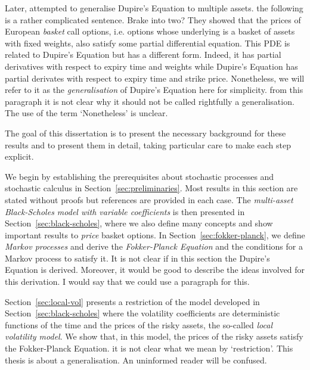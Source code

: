 \documentclass[english]{article}
\newcommand{\comment}[1]{\color{blue}#1\color{black}}
\numberwithin{equation}{section}
\numberwithin{figure}{section}
\theoremstyle{bolddescit}
\theoremstyle{definition}
\theoremstyle{definition}
\theoremstyle{plain}
\theoremstyle{plain}
\theoremstyle{bolddesc}
\theoremstyle{plain}
\theoremstyle{remark}
\begin{document}
Later, \textcite{pablo_amster_towards_2009} attempted to generalise Dupire's Equation to multiple assets.
\comment{the following is a rather complicated sentence. Brake into two?}
They showed that the prices of European \textit{basket} call options, i.e. options whose underlying is a basket of assets with fixed weights, also satisfy some partial differential equation. This PDE is related to Dupire's Equation but has a different form. Indeed, it has partial derivatives with respect to expiry time and weights while Dupire's Equation has partial derivates with respect to expiry time and strike price. Nonetheless, we will refer to it as the \textit{generalisation} of Dupire's Equation here for simplicity. %
\comment{from this paragraph it is not clear why it should not be called rightfully a generalisation. The use of the term `Nonetheless' is unclear.}

The goal of this dissertation is to present the necessary background for these results and to present them in detail, taking particular care to make each step explicit.

We begin by establishing the prerequisites about stochastic processes and stochastic calculus in Section~\ref{sec:preliminaries}. Most results in this section are stated without proofs but references are provided in each case. The \textit{multi-asset Black-Scholes model with variable coefficients} is then presented in Section~\ref{sec:black-scholes}, where we also define many concepts and show important results to \textit{price} basket options. In Section~\ref{sec:fokker-planck}, we define \textit{Markov processes} and derive the \textit{Fokker-Planck Equation} and the conditions for a Markov process to satisfy it.
\comment{It is not clear if in this section the Dupire's Equation is derived. Moreover, it would be good to describe the ideas involved for this derivation. I would say that we could use a paragraph for this. }

Section~\ref{sec:local-vol} presents a restriction of the model developed in Section~\ref{sec:black-scholes} where the volatility coefficients are deterministic functions of the time and the prices of the risky assets, the so-called \textit{local volatility model}. We show that, in this model, the prices of the risky assets satisfy the Fokker-Planck Equation.
\comment{it is not clear what we mean by `restriction'. This thesis is about a generalisation. An uninformed reader will be confused.}
\end{document}
